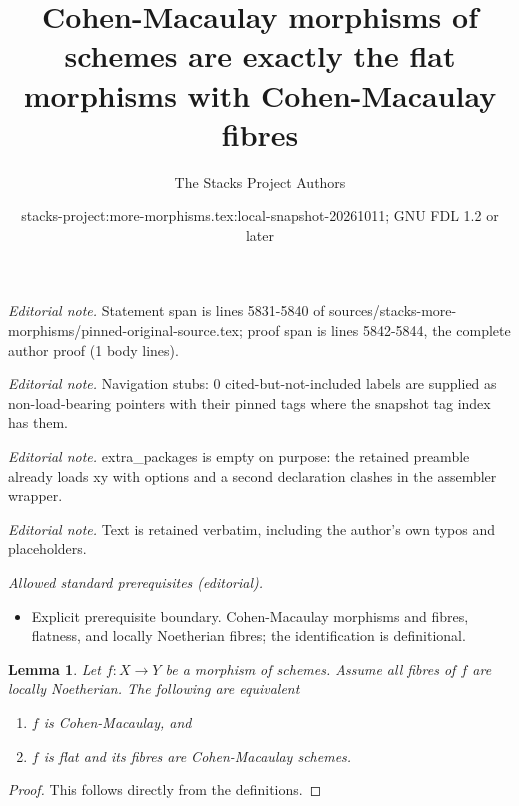\documentclass[10pt,a4paper]{amsart}
\title{Cohen-Macaulay morphisms of schemes are exactly the flat morphisms with Cohen-Macaulay fibres}
\author{The Stacks Project Authors}
\date{stacks-project:more-morphisms.tex:local-snapshot-20261011; GNU FDL 1.2 or later}
\theoremstyle{plain}
\newtheorem{lemma}[subsection]{Lemma}
\theoremstyle{definition}
\theoremstyle{remark}
\numberwithin{equation}{subsection}
\begin{document}
\maketitle
\noindent\textit{Editorial note.} Statement span is lines 5831-5840 of sources/stacks-more-morphisms/pinned-original-source.tex; proof span is lines 5842-5844, the complete author proof (1 body lines).\par\medskip
\noindent\textit{Editorial note.} Navigation stubs: 0 cited-but-not-included labels are supplied as non-load-bearing pointers with their pinned tags where the snapshot tag index has them.\par\medskip
\noindent\textit{Editorial note.} extra\_packages is empty on purpose: the retained preamble already loads xy with options and a second declaration clashes in the assembler wrapper.\par\medskip
\noindent\textit{Editorial note.} Text is retained verbatim, including the author's own typos and placeholders.\par\medskip
\noindent\textit{Allowed standard prerequisites (editorial).}\begin{itemize}
\item Explicit prerequisite boundary. Cohen-Macaulay morphisms and fibres, flatness, and locally Noetherian fibres; the identification is definitional.
\end{itemize}\medskip
\begin{lemma}
\label{lemma-CM}
Let $f : X \to Y$ be a morphism of schemes.
Assume all fibres of $f$ are locally Noetherian.
The following are equivalent
\begin{enumerate}
\item $f$ is Cohen-Macaulay, and
\item $f$ is flat and its fibres are Cohen-Macaulay schemes.
\end{enumerate}
\end{lemma}

\begin{proof}
This follows directly from the definitions.
\end{proof}
\end{document}
